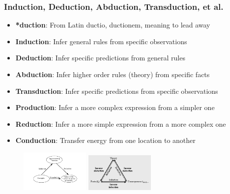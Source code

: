\documentclass{beamer}
\begin{document}
  \begin{frame}
    \frametitle{Induction, Deduction, Abduction, Transduction, et al.}
    \begin{itemize}
      \item \textbf{*duction}: From Latin ductio, ductionem, meaning to lead away
      \item \textbf{Induction}: Infer general rules from specific observations
      \item \textbf{Deduction}: Infer specific predictions from general rules
      \item \textbf{Abduction}: Infer higher order rules (theory) from specific facts
      \item \textbf{Transduction}: Infer specific predictions from specific observations
      \item \textbf{Production}: Infer a more complex expression from a simpler one
      \item \textbf{Reduction}: Infer a more simple expression from a more complex one
      \item \textbf{Conduction}: Transfer energy from one location to another
    \end{itemize}
    \begin{figure}[H]
      \centering
      \includegraphics[width=0.3\textwidth]{../clipart/induction_deduction_transduction.png}
      \includegraphics[width=0.3\textwidth]{../clipart/induction_deduction_abduction.png}
    \end{figure}
  \end{frame}
\end{document}
